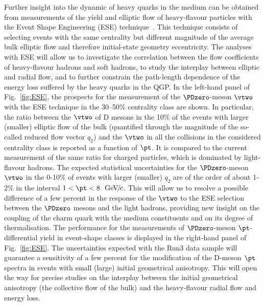 Further insight into the dynamic of heavy quarks in the medium can be
obtained from measurements of the yield and elliptic flow of heavy-flavour
particles with the Event Shape Engineering (ESE) 
technique~\cite{Schukraft:2012ah}.
This technique consists of selecting events with the same centrality but 
different magnitude of the average bulk elliptic flow and therefore initial-state geometry eccentricity.
The analyses with ESE will allow us to investigate the correlation between 
the flow coefficients of heavy-flavour hadrons and soft hadrons, to study the interplay between elliptic and radial flow, and to further constrain the path-length dependence of the energy loss suffered by the heavy quarks in the QGP.
In the left-hand panel of Fig.~\ref{fig:ESE}, the prospects for the measurement of the ${\PDzero}$-meson $\vtwo$ with the ESE technique in the 30--50\% centrality class are shown.
In particular, the ratio between the $\vtwo$ of D mesons in the 10\% of the events with larger (smaller) elliptic flow of the bulk (quantified through the magnitude of the so-called reduced flow vector $q_2$) and the $\vtwo$ in all the collisions in the considered centrality class is reported as a function of $\pt$.
It is compared to the current measurement of the same ratio for charged 
particles, which is dominated by light-flavour hadrons.
The expected statistical uncertainties for the $\PDzero$-meson $\vtwo$ in the 0-10\% of events with larger (smaller) $q_2$ are of the order of about 1-2\% in the interval $1 < \pt < 8~\UGeVc$. This will allow us to resolve a possible difference of a few percent in the response of the $\vtwo$ to the ESE selection between the $\PDzero$ mesons and the light hadrons, providing new insight on the coupling of the charm quark with the medium constituents and on its degree of thermalisation. 
The performance for the measurements of $\PDzero$-meson 
$\pt$-differential yield in event-shape classes is displayed in the right-hand panel of Fig.~\ref{fig:ESE}.
The uncertainties expected with the Run3 data sample will guarantee a sensitivity of a few percent for the modification of 
the D-meson $\pt$ spectra in events with small (large) initial 
geometrical anisotropy.
This will open the way for precise studies on the interplay between the initial geometrical anisotropy (the collective flow of the bulk) and the heavy-flavour radial flow and energy loss.

